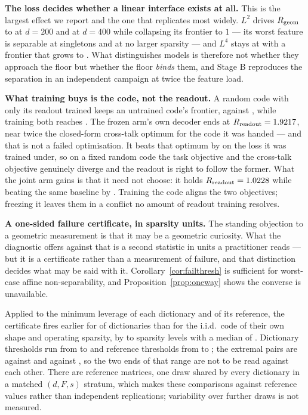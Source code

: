 \textbf{The loss decides whether a linear interface exists at all.} This is the largest effect we
report and the one that replicates most widely. $L^2$ drives $R_{\mathrm{geom}}$ to \SALtwoTwoHundredRgeom{} at
$d=200$ and \ScLtwoRgeom{} at $d=400$ while collapsing its frontier to $1$ --- its worst feature is
separable at singletons and at no larger sparsity --- and $L^4$ stays at \SALfourTwoHundredRgeom{}
with a frontier that grows to \ScMeasured{}. What
distinguishes models is therefore not whether they approach the floor but whether the floor
\emph{binds} them, and Stage B reproduces the separation in an independent campaign at twice the
feature load.

\textbf{What training buys is the code, not the readout.} A random code with only its readout trained
keeps an untrained code's frontier, \EeightFrozenHundredKappa{} against \EeightRandomHundredKappa{},
while training both reaches \EeightTrainedHundredKappa{}. The frozen arm's own decoder ends at
$R_{\mathrm{readout}}=1.9217{}$, near twice the closed-form cross-talk optimum for the
code it was handed --- and that is not a failed optimisation. It beats that optimum by
\EeightFrozenHundredTaskGain{} on the loss it was trained under, so on a fixed random code the task
objective and the cross-talk objective genuinely diverge and the readout is right to follow the
former. What the joint arm gains is that it need not choose: it holds
$R_{\mathrm{readout}}=1.0228{}$ while beating the same baseline by
\EeightTrainedHundredTaskGain{}. Training the code aligns the two objectives; freezing it leaves them
in a conflict no amount of readout training resolves.

\textbf{A one-sided failure certificate, in sparsity units.} The standing objection to a geometric
measurement is that it may be a geometric curiosity. What the diagnostic offers against that is a
second statistic in units a practitioner reads --- but it is a certificate rather than a measurement
of failure, and that distinction decides what may be said with it.
Corollary~\ref{cor:failthresh} is sufficient for worst-case affine non-separability, and
Proposition~\ref{prop:oneway} shows the converse is unavailable.

Applied to the minimum leverage of each dictionary and of its reference, the certificate fires
earlier for \SaeFailEarlier{} of \SaeDicts{} dictionaries than for the i.i.d.\ code of their own
shape and operating sparsity, by \SaeFailGapMin{} to \SaeFailGapMax{} sparsity levels with a median
of \SaeFailGapMedian{}. Dictionary thresholds run from \SaeFailTrainedMin{} to \SaeFailTrainedMax{}
and reference thresholds from \SaeFailCtlMin{} to \SaeFailCtlMax{}; the extremal pairs are
\SaeFailPairNarrowestDict{} against \SaeFailPairNarrowestCtl{} and \SaeFailPairWidestDict{} against
\SaeFailPairWidestCtl{}, so the two ends of that range are not to be read against each other. There
are \SaeFailRefs{} reference matrices, one draw shared by every dictionary in a matched
$(d,F,s)$ stratum, which makes these \SaeDicts{} comparisons against \SaeFailRefs{} reference values
rather than \SaeDicts{} independent replications; variability over further draws is not measured.

